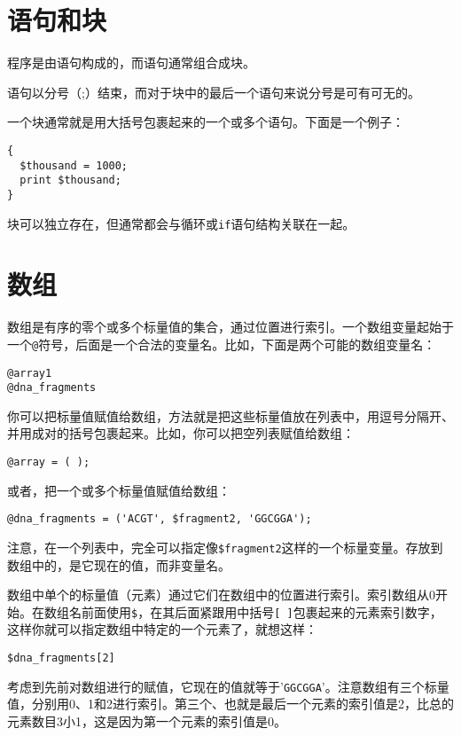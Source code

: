 \section{语句和块}
程序是由语句构成的，而语句通常组合成块。

语句以分号（;）结束，而对于块中的最后一个语句来说分号是可有可无的。

一个块通常就是用大括号包裹起来的一个或多个语句。下面是一个例子：

\begin{lstlisting}
{
  $thousand = 1000;
  print $thousand;
}
\end{lstlisting}

块可以独立存在，但通常都会与循环或\verb|if|语句结构关联在一起。

\section{数组}
数组是有序的零个或多个标量值的集合，通过位置进行索引。一个数组变量起始于一个\verb|@|符号，后面是一个合法的变量名。比如，下面是两个可能的数组变量名：

\begin{lstlisting}
@array1
@dna_fragments
\end{lstlisting}

你可以把标量值赋值给数组，方法就是把这些标量值放在列表中，用逗号分隔开、并用成对的括号包裹起来。比如，你可以把空列表赋值给数组：

\begin{lstlisting}
@array = ( );
\end{lstlisting}

或者，把一个或多个标量值赋值给数组：

\begin{lstlisting}
@dna_fragments = ('ACGT', $fragment2, 'GGCGGA');
\end{lstlisting}

注意，在一个列表中，完全可以指定像\verb|$fragment2|这样的一个标量变量。存放到数组中的，是它现在的值，而非变量名。

数组中单个的标量值（元素）通过它们在数组中的位置进行索引。索引数组从0开始。在数组名前面使用\verb|$|，在其后面紧跟用中括号\verb|[ ]|包裹起来的元素索引数字，这样你就可以指定数组中特定的一个元素了，就想这样：

\begin{lstlisting}
$dna_fragments[2]
\end{lstlisting}

考虑到先前对数组进行的赋值，它现在的值就等于'\verb|GGCGGA|'。注意数组有三个标量值，分别用0、1和2进行索引。第三个、也就是最后一个元素的索引值是2，比总的元素数目3小1，这是因为第一个元素的索引值是0。

